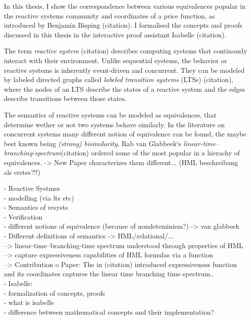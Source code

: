 %
\begin{isabellebody}%
%
%
\isadelimtheory
%
\endisadelimtheory
%
\isatagtheory
%
\endisatagtheory
{\isafoldtheory}%
%
\isadelimtheory
%
\endisadelimtheory
%
\isadelimdocument
%
\endisadelimdocument
%
\isatagdocument
%
\isamarkuptrue%
%
\endisatagdocument
{\isafolddocument}%
%
\isadelimdocument
%
\endisadelimdocument
%
\begin{isamarkuptext}%
In this thesis, I show the correspondence between various equivalences popular in the reactive
systems community and coordinates of a price function, as introduced by Benjamin Bisping (citation).
I formalised the concepts and proofs discussed in this thesis in the interactive proof assistant Isabelle (citation).

The term \emph{reactive system} (citation) describes computing systems that continously interact with their environment. Unlike sequential systems, 
the behavior or reactive systems is inherently event-driven and concurrent. They can be modeled by labeled directed graphs called \emph{labeled transition systems} (LTSs) (citation),
where the nodes of an LTS describe the states of a reactive system and the edges describe transitions between those states.

The semantics of reactive systems can be modeled as equivalences, that determine wether or not two systems behave similarly.
In the literature on concurrent systems many different notion of equivalence can be found, the maybe best known being \emph{(strong) bisimilarity}.
Rab van Glabbeek`s \emph{linear-time--branching-spectrum}(citation) ordered some of the most popular in a hierachy of equivalences.
-> New Paper characterizes them different... (HML beschreibung als erstes?!!)


- Reactive Systmes \\
  - modelling (via lts etc) \\
  - Semantics of resysts \\
    - Verification \\
    - different notions of equivalence (because of nondeteminism?) -> van glabbeek \\
    - Different definitions of semantics -> HML/relational/... \\
 --> linear-time--branching-time spectrum understood through properties of HML \\
  --> capture expressiveness capabilities of HML formulas via a function \\
--> Contribution o Paper: The in (citation) introduced expressiveness function 
and its coordinates captures the linear time branching time spectrum.. \\
- Isabelle:\\
  - formalization of concepts, proofs \\
  - what is isabelle \\
  - difference between mathematical concepts and their implementation? \\%
\end{isamarkuptext}\isamarkuptrue%
%
\isadelimtheory
%
\endisadelimtheory
%
\isatagtheory
%
\endisatagtheory
{\isafoldtheory}%
%
\isadelimtheory
%
\endisadelimtheory
%
\end{isabellebody}%
